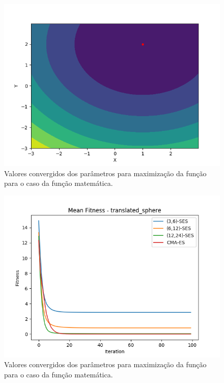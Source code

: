 \documentclass[conference]{IEEEtran}
\begin{document}
\begin{figure}[htbp]
\centering
\centerline{\includegraphics[scale=0.4]{imagens/translated_sphere/cmaes.png}}
\caption{Valores convergidos dos parâmetros para maximização da função para o caso da função matemática.}
\label{translated_sphere/cmaes}
\end{figure}

\begin{figure}[htbp]
\centering
\centerline{\includegraphics[scale=0.4]{imagens/translated_sphere/mean_fitness.png}}
\caption{Valores convergidos dos parâmetros para maximização da função para o caso da função matemática.}
\label{translated_sphere/mean_fitness}
\end{figure}
\end{document}
